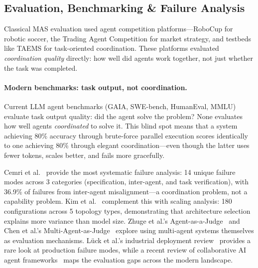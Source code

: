 \documentclass{article}
\begin{document}
\label{sec:p-frameworks}
\subsection{Evaluation, Benchmarking \& Failure Analysis}
\label{sec:p-eval}

%
%
%
%
%
%

Classical MAS evaluation used agent competition platforms---RoboCup for robotic soccer,
the Trading Agent Competition for market strategy, and testbeds like TAEMS for
task-oriented coordination. These platforms evaluated \emph{coordination quality}
directly: how well did agents work together, not just whether the task was completed.

\paragraph{Modern benchmarks: task output, not coordination.}
Current LLM agent benchmarks (GAIA, SWE-bench, HumanEval, MMLU) evaluate task output
quality: did the agent solve the problem? None evaluates how well agents \emph{coordinated}
to solve it. This blind spot means that a system achieving 80\% accuracy through brute-force
parallel execution scores identically to one achieving 80\% through elegant
coordination---even though the latter uses fewer tokens, scales better, and fails more
gracefully.

Cemri et al.~\citep{cemri2025fail} provide the most systematic failure analysis: 14
unique failure modes across 3 categories (specification, inter-agent, and task
verification), with 36.9\% of failures from inter-agent misalignment---a coordination
problem, not a capability problem. Kim et al.~\citep{kim2025scaling} complement this
with scaling analysis: 180 configurations across 5 topology types, demonstrating that
architecture selection explains more variance than model size.
Zhuge et al.'s Agent-as-a-Judge~\citep{sutra8559_when2025} and Chen et al.'s
Multi-Agent-as-Judge~\citep{sutra6633_multiagentasjudge2025} explore using
multi-agent systems themselves as evaluation mechanisms. Lück et al.'s industrial
deployment review~\citep{sutra17485_industrial2008} provides a rare look at
production failure modes, while a recent review of collaborative AI agent
frameworks~\citep{sutra24515_review2025} maps the evaluation gaps across the
modern landscape.
\end{document}
